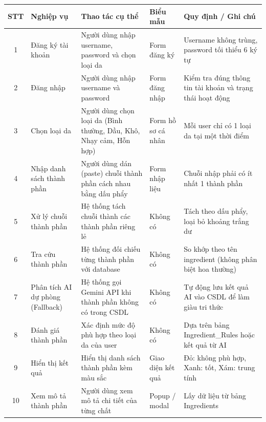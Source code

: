 \documentclass[12pt,a4paper]{article}
\begin{document}
\begin{center}
\begin{tabular}{|c|p{3cm}|p{5cm}|p{2.5cm}|p{3cm}|}
\hline
\textbf{STT} & \textbf{Nghiệp vụ} & \textbf{Thao tác cụ thể} & \textbf{Biểu mẫu} & \textbf{Quy định / Ghi chú} \\
\hline

1 & Đăng ký tài khoản 
& Người dùng nhập username, password và chọn loại da 
& Form đăng ký 
& Username không trùng, password tối thiểu 6 ký tự \\
\hline

2 & Đăng nhập 
& Người dùng nhập username và password 
& Form đăng nhập 
& Kiểm tra đúng thông tin tài khoản và trạng thái hoạt động \\
\hline

3 & Chọn loại da 
& Người dùng chọn loại da (Bình thường, Dầu, Khô, Nhạy cảm, Hỗn hợp) 
& Form hồ sơ cá nhân 
& Mỗi user chỉ có 1 loại da tại một thời điểm \\
\hline

4 & Nhập danh sách thành phần 
& Người dùng dán (paste) chuỗi thành phần cách nhau bằng dấu phẩy 
& Form nhập liệu 
& Chuỗi nhập phải có ít nhất 1 thành phần \\
\hline

5 & Xử lý chuỗi thành phần 
& Hệ thống tách chuỗi thành các thành phần riêng lẻ 
& Không có 
& Tách theo dấu phẩy, loại bỏ khoảng trắng dư \\
\hline

6 & Tra cứu thành phần 
& Hệ thống đối chiếu từng thành phần với database 
& Không có 
& So khớp theo tên ingredient (không phân biệt hoa thường) \\
\hline

7 & Phân tích AI dự phòng (Fallback)
& Hệ thống gọi Gemini API khi thành phần không có trong CSDL
& Không có 
& Tự động lưu kết quả AI vào CSDL để làm giàu tri thức \\
\hline

8 & Đánh giá thành phần 
& Xác định mức độ phù hợp theo loại da của user 
& Không có 
& Dựa trên bảng Ingredient\_Rules hoặc kết quả từ AI \\
\hline

9 & Hiển thị kết quả 
& Hiển thị danh sách thành phần kèm màu sắc 
& Giao diện kết quả 
& Đỏ: không phù hợp, Xanh: tốt, Xám: trung tính \\
\hline

10 & Xem mô tả thành phần 
& Người dùng xem mô tả chi tiết của từng chất 
& Popup / modal 
& Lấy dữ liệu từ bảng Ingredients \\
\hline


\end{tabular}
\end{center}
\end{document}
